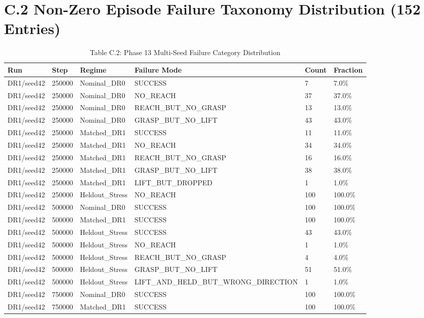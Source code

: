 \documentclass[11pt,a4paper,oneside]{book}
\begin{document}
\section{C.2 Non-Zero Episode Failure Taxonomy Distribution (152 Entries)}
\begin{longtable}{l l l l l l}\caption{Table C.2: Phase 13 Multi-Seed Failure Category Distribution}\\\toprule
Run & Step & Regime & Failure Mode & Count & Fraction \\ \midrule \endhead
DR1/seed42 & 250000 & Nominal\_DR0 & SUCCESS & 7 & 7.0\% \\
DR1/seed42 & 250000 & Nominal\_DR0 & NO\_REACH & 37 & 37.0\% \\
DR1/seed42 & 250000 & Nominal\_DR0 & REACH\_BUT\_NO\_GRASP & 13 & 13.0\% \\
DR1/seed42 & 250000 & Nominal\_DR0 & GRASP\_BUT\_NO\_LIFT & 43 & 43.0\% \\
DR1/seed42 & 250000 & Matched\_DR1 & SUCCESS & 11 & 11.0\% \\
DR1/seed42 & 250000 & Matched\_DR1 & NO\_REACH & 34 & 34.0\% \\
DR1/seed42 & 250000 & Matched\_DR1 & REACH\_BUT\_NO\_GRASP & 16 & 16.0\% \\
DR1/seed42 & 250000 & Matched\_DR1 & GRASP\_BUT\_NO\_LIFT & 38 & 38.0\% \\
DR1/seed42 & 250000 & Matched\_DR1 & LIFT\_BUT\_DROPPED & 1 & 1.0\% \\
DR1/seed42 & 250000 & Heldout\_Stress & NO\_REACH & 100 & 100.0\% \\
DR1/seed42 & 500000 & Nominal\_DR0 & SUCCESS & 100 & 100.0\% \\
DR1/seed42 & 500000 & Matched\_DR1 & SUCCESS & 100 & 100.0\% \\
DR1/seed42 & 500000 & Heldout\_Stress & SUCCESS & 43 & 43.0\% \\
DR1/seed42 & 500000 & Heldout\_Stress & NO\_REACH & 1 & 1.0\% \\
DR1/seed42 & 500000 & Heldout\_Stress & REACH\_BUT\_NO\_GRASP & 4 & 4.0\% \\
DR1/seed42 & 500000 & Heldout\_Stress & GRASP\_BUT\_NO\_LIFT & 51 & 51.0\% \\
DR1/seed42 & 500000 & Heldout\_Stress & LIFT\_AND\_HELD\_BUT\_WRONG\_DIRECTION & 1 & 1.0\% \\
DR1/seed42 & 750000 & Nominal\_DR0 & SUCCESS & 100 & 100.0\% \\
DR1/seed42 & 750000 & Matched\_DR1 & SUCCESS & 100 & 100.0\% \\

\end{longtable}
\end{document}
